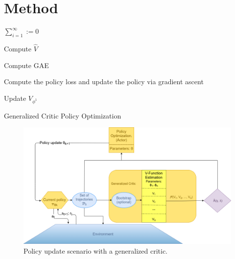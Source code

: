 \section{Method}
\label{sec:meth}
\begin{algorithm}[H]
\DontPrintSemicolon
  
  $\sum_{i=1}^{\infty} := 0$


   Compute $\hat{V}$

   Compute GAE

   Compute the policy loss and update the policy via gradient ascent

    {
    	Update $V_{\phi^1}$	
    } 
    
\caption{Generalized Critic Policy Optimization}

\end{algorithm}

\begin{figure}[!htb]
\includegraphics[width=\linewidth]{images/model}
\caption{Policy update scenario with a generalized critic.}
\label{fig:model}
\end{figure}
